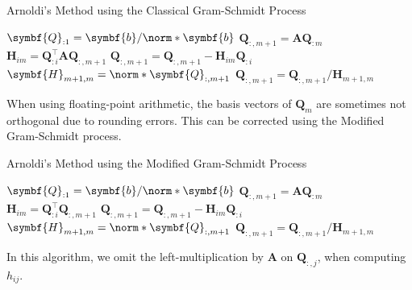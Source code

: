 \documentclass{article}
\begin{document}
\begin{algorithm}[H]
    \caption{Arnoldi's Method using the Classical Gram-Schmidt Process}
    \begin{algorithmic}
        \State \(\symbf{Q}_{:1} = \symbf{b}/\norm*{\symbf{b}}\)
        \State \(\symbf{Q}_{:,m+1} = \symbf{A} \symbf{Q}_{:m}\)
        \State \(\symbf{H}_{im} = \symbf{Q}_{:i}^\top \symbf{A} \symbf{Q}_{:,m+1}\) 
        \State \(\symbf{Q}_{:,m+1} = \symbf{Q}_{:,m+1} - \symbf{H}_{im} \symbf{Q}_{:i}\)
        \EndFor
        \State \(\symbf{H}_{m+1,m} = \norm*{\symbf{Q}_{:,m+1}}\) 
        \Statex
        \State \(\symbf{Q}_{:,m+1} = \symbf{Q}_{:,m+1} / \symbf{H}_{m+1,m}\) 
        \EndIf
        \EndFor
    \end{algorithmic}
\end{algorithm}
When using floating-point arithmetic, the basis vectors of \(\symbf{Q}_m\)
are sometimes not orthogonal due to rounding errors. This can be corrected
using the Modified Gram-Schmidt process.
\begin{algorithm}[H]
    \caption{Arnoldi's Method using the Modified Gram-Schmidt Process}
    \begin{algorithmic}
        \State \(\symbf{Q}_{:1} = \symbf{b}/\norm*{\symbf{b}}\)
        \State \(\symbf{Q}_{:,m+1} = \symbf{A} \symbf{Q}_{:m}\)
        \State \(\symbf{H}_{im} = \symbf{Q}_{:i}^\top \symbf{Q}_{:,m+1}\) 
        \State \(\symbf{Q}_{:,m+1} = \symbf{Q}_{:,m+1} - \symbf{H}_{im} \symbf{Q}_{:i}\)
        \EndFor
        \State \(\symbf{H}_{m+1,m} = \norm*{\symbf{Q}_{:,m+1}}\) 
        \Statex
        \State \(\symbf{Q}_{:,m+1} = \symbf{Q}_{:,m+1} / \symbf{H}_{m+1,m}\) 
        \EndIf
        \EndFor
    \end{algorithmic}
\end{algorithm}
In this algorithm, we omit the left-multiplication by \(\symbf{A}\) on
\(\symbf{Q}_{:,j}\), when computing \(h_{ij}\).
\end{document}
